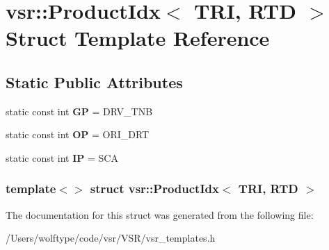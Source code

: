 \hypertarget{structvsr_1_1_product_idx_3_01_t_r_i_00_01_r_t_d_01_4}{\section{vsr\-:\-:Product\-Idx$<$ T\-R\-I, R\-T\-D $>$ Struct Template Reference}
\label{structvsr_1_1_product_idx_3_01_t_r_i_00_01_r_t_d_01_4}
}
\subsection*{Static Public Attributes}
\begin{DoxyCompactItemize}
\item 
\hypertarget{structvsr_1_1_product_idx_3_01_t_r_i_00_01_r_t_d_01_4_aecc933c663f81e8e0965e8fdc50dc12b}{static const int {\bfseries G\-P} = D\-R\-V\-\_\-\-T\-N\-B}\label{structvsr_1_1_product_idx_3_01_t_r_i_00_01_r_t_d_01_4_aecc933c663f81e8e0965e8fdc50dc12b}

\item 
\hypertarget{structvsr_1_1_product_idx_3_01_t_r_i_00_01_r_t_d_01_4_a3685572831bde638d9efda82d2c94870}{static const int {\bfseries O\-P} = O\-R\-I\-\_\-\-D\-R\-T}\label{structvsr_1_1_product_idx_3_01_t_r_i_00_01_r_t_d_01_4_a3685572831bde638d9efda82d2c94870}

\item 
\hypertarget{structvsr_1_1_product_idx_3_01_t_r_i_00_01_r_t_d_01_4_a596f7b73875be50472401b6e29c91037}{static const int {\bfseries I\-P} = S\-C\-A}\label{structvsr_1_1_product_idx_3_01_t_r_i_00_01_r_t_d_01_4_a596f7b73875be50472401b6e29c91037}

\end{DoxyCompactItemize}
\subsubsection*{template$<$$>$ struct vsr\-::\-Product\-Idx$<$ T\-R\-I, R\-T\-D $>$}



The documentation for this struct was generated from the following file\-:\begin{DoxyCompactItemize}
\item 
/\-Users/wolftype/code/vsr/\-V\-S\-R/vsr\-\_\-templates.\-h\end{DoxyCompactItemize}
